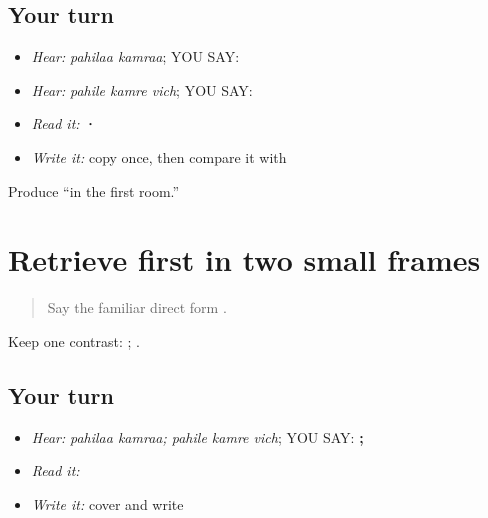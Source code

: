 \subsection*{Your turn}
\begin{itemize}
\raggedright
  \item \emph{Hear:} \emph{pahilaa kamraa}; YOU SAY: \textbf{ }
  \item \emph{Hear:} \emph{pahile kamre vich}; YOU SAY: \textbf{  }
  \item \emph{Read it:} \textbf{  ·   }
  \item \emph{Write it:} copy \textbf{} once, then compare it with \textbf{}
\end{itemize}

\begin{tcolorbox}[breakable,colback=teal!4,colframe=teal!35!black,title={Before you move on}]
Produce “in the first room.”
\end{tcolorbox}
\section[\texorpdfstring{\pa{ਪਹਿਲਾ} · \pa{ਪਹਿਲੇ} (pahilaa; pahile)}{ਪਹਿਲਾ · ਪਹਿਲੇ (pahilaa; pahile)}]{Retrieve first in two small frames}

\label{lesson:PA-C193-pahile-review}



\begin{quote}
Say the familiar direct form \textbf{}.
\end{quote}

\begin{grammarlens}[title={Grammar Lens}]
Keep one contrast: \textbf{ }; \textbf{  }.
\end{grammarlens}

\subsection*{Your turn}
\begin{itemize}
\raggedright
  \item \emph{Hear:} \emph{pahilaa kamraa; pahile kamre vich}; YOU SAY: \textbf{ ;   }
  \item \emph{Read it:} \textbf{  }
  \item \emph{Write it:} cover and write \textbf{}
\end{itemize}

